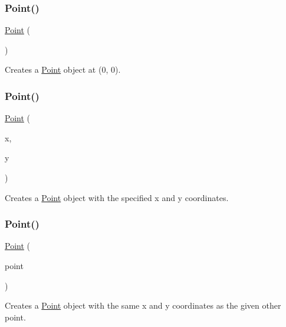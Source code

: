 \subsubsection{\texorpdfstring{Point()}{Point()}\hspace{0.1cm}{\footnotesize\ttfamily [1/3]}}
{\footnotesize\ttfamily \mbox{\hyperlink{classPoint}{Point}} (\begin{DoxyParamCaption}{ }\end{DoxyParamCaption})}



Creates a {\ttfamily \mbox{\hyperlink{classPoint}{Point}}} object at (0, 0). 

\mbox{\label{classPoint_a6773b78ca9523d4d482ac886b41a1bfc}} 
\subsubsection{\texorpdfstring{Point()}{Point()}\hspace{0.1cm}{\footnotesize\ttfamily [2/3]}}
{\footnotesize\ttfamily \mbox{\hyperlink{classPoint}{Point}} (\begin{DoxyParamCaption}\item[{int}]{x,  }\item[{int}]{y }\end{DoxyParamCaption})}



Creates a {\ttfamily \mbox{\hyperlink{classPoint}{Point}}} object with the specified x and y coordinates. 

\mbox{\label{classPoint_af5c561032606b32861e8ebdc949397ad}} 
\subsubsection{\texorpdfstring{Point()}{Point()}\hspace{0.1cm}{\footnotesize\ttfamily [3/3]}}
{\footnotesize\ttfamily \mbox{\hyperlink{classPoint}{Point}} (\begin{DoxyParamCaption}\item[{const \mbox{\hyperlink{classGPoint}{G\+Point}} \&}]{point }\end{DoxyParamCaption})}



Creates a {\ttfamily \mbox{\hyperlink{classPoint}{Point}}} object with the same x and y coordinates as the given other point. 




